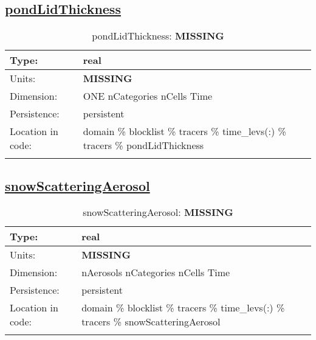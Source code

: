 \subsection[pondLidThickness]{\hyperref[sec:var_tab_tracers]{pondLidThickness}}
\label{subsec:var_sec_tracers_pondLidThickness}
\begin{center}
\begin{longtable}{| p{2.0in} | p{4.0in} |}
        \hline 
        Type: & real \\
        \hline 
        Units: & {\bf \color{red} MISSING} \\
        \hline 
        Dimension: & ONE nCategories nCells Time \\
        \hline 
        Persistence: & persistent \\
        \hline 
         Location in code: & domain \% blocklist \% tracers \% time\_levs(:) \% tracers \% pondLidThickness \\
         \hline 
    \caption{pondLidThickness: {\bf \color{red} MISSING}}
\end{longtable}
\end{center}
\subsection[snowScatteringAerosol]{\hyperref[sec:var_tab_tracers]{snowScatteringAerosol}}
\label{subsec:var_sec_tracers_snowScatteringAerosol}
\begin{center}
\begin{longtable}{| p{2.0in} | p{4.0in} |}
        \hline 
        Type: & real \\
        \hline 
        Units: & {\bf \color{red} MISSING} \\
        \hline 
        Dimension: & nAerosols nCategories nCells Time \\
        \hline 
        Persistence: & persistent \\
        \hline 
         Location in code: & domain \% blocklist \% tracers \% time\_levs(:) \% tracers \% snowScatteringAerosol \\
         \hline 
    \caption{snowScatteringAerosol: {\bf \color{red} MISSING}}
\end{longtable}
\end{center}
